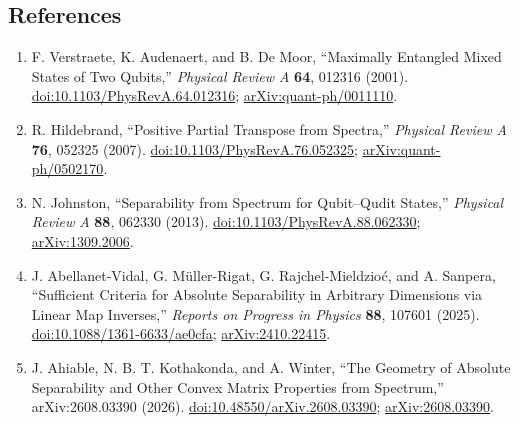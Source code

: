 \subsection*{References}

\begin{enumerate}[label={},leftmargin=4.8em,labelsep=0.5em]
  \footnotesize
  \item[\textup{[VAD01]}]\label{ref:p15-verstraete-et-al}
  F. Verstraete, K. Audenaert, and B. De Moor,
  ``Maximally Entangled Mixed States of Two Qubits,''
  \emph{Physical Review A} \textbf{64}, 012316 (2001).
  \href{https://doi.org/10.1103/PhysRevA.64.012316}%
       {doi:10.1103/PhysRevA.64.012316};
  \href{https://arxiv.org/abs/quant-ph/0011110}%
       {arXiv:quant-ph/0011110}.

  \item[\textup{[Hil07]}]\label{ref:p15-hildebrand}
  R. Hildebrand,
  ``Positive Partial Transpose from Spectra,''
  \emph{Physical Review A} \textbf{76}, 052325 (2007).
  \href{https://doi.org/10.1103/PhysRevA.76.052325}%
       {doi:10.1103/PhysRevA.76.052325};
  \href{https://arxiv.org/abs/quant-ph/0502170}%
       {arXiv:quant-ph/0502170}.

  \item[\textup{[Joh13]}]\label{ref:p15-johnston}
  N. Johnston,
  ``Separability from Spectrum for Qubit--Qudit States,''
  \emph{Physical Review A} \textbf{88}, 062330 (2013).\newline
  \href{https://doi.org/10.1103/PhysRevA.88.062330}%
       {doi:10.1103/PhysRevA.88.062330};
  \href{https://arxiv.org/abs/1309.2006}{arXiv:1309.2006}.

  \item[\textup{[AMR+25]}]\label{ref:p15-abellanet-vidal-et-al}
  J. Abellanet-Vidal, G. Müller-Rigat, G. Rajchel-Mieldzioć, and A. Sanpera,
  ``Sufficient Criteria for Absolute Separability in Arbitrary Dimensions
  via Linear Map Inverses,''
  \emph{Reports on Progress in Physics} \textbf{88}, 107601 (2025).
  \href{https://doi.org/10.1088/1361-6633/ae0cfa}%
       {doi:10.1088/1361-6633/ae0cfa};
  \href{https://arxiv.org/abs/2410.22415}{arXiv:2410.22415}.

  \item[\textup{[AKW26]}]\label{ref:p15-ahiable-et-al}
  J. Ahiable, N. B. T. Kothakonda, and A. Winter,
  ``The Geometry of Absolute Separability and Other Convex Matrix Properties
  from Spectrum,'' arXiv:2608.03390 (2026).
  \href{https://doi.org/10.48550/arXiv.2608.03390}%
       {doi:10.48550/arXiv.2608.03390};
  \href{https://arxiv.org/abs/2608.03390}{arXiv:2608.03390}.


\end{enumerate}
